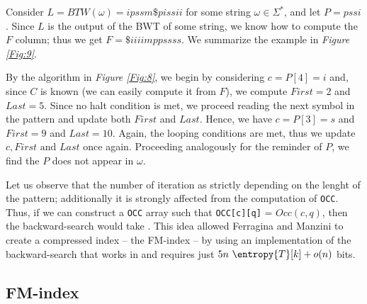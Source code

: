 \documentclass{subfiles}
\begin{document}
        \begin{example*}
            Consider \(L = BTW(\omega) = ipssm\$pissii\) for some string \(\omega \in \Sigma^{*}\),
            and let \(P = pssi\). Since \(L\) is the output of the BWT of some string,
            we know how to compute the \(F\) column\footnotemark; thus we get \(F = \$ iiiimppssss\).
            We summarize the example in \emph{Figure \ref{Fig:9}}.
            

            By the algorithm in \emph{Figure \ref{Fig:8}}, we begin by considering 
            \(c = P[4] = i\) and, since \(C\) is known (we can easily compute it from \(F\)),
            we compute \(First = 2\) and \(Last = 5\). Since no halt condition is met,
            we proceed reading the next symbol in the pattern and update both \(First\) and \(Last\).
            Hence, we have \(c = P[3] = s\) and \(First = 9\) and \(Last = 10\). 
            Again, the looping conditions are met, thus we update \(c, First \text{ and } Last\)
            once again. Proceeding analogously for the reminder of \(P\), 
            we find the \(P\) does not appear in \(\omega\).

        \end{example*}

        Let us observe that the number of iteration as strictly depending on the lenght of the pattern;
            additionally it is strongly affected from the computation of \lstinline{OCC}.
            Thus, if we can construct a \lstinline{OCC} array such that \lstinline{OCC[c][q]} = \(Occ(c, q)\),
            then the backward-search would take .
            This idea allowed Ferragina and Manzini to create a compressed index -- the FM-index -- 
            by using an implementation of the backward-search that works in  and requires just 
            \(5n \ \entropy{T}[k] + o(n)\) bits.

        \subsection{FM-index}\label{Sec:7.1}
        
\end{document}

